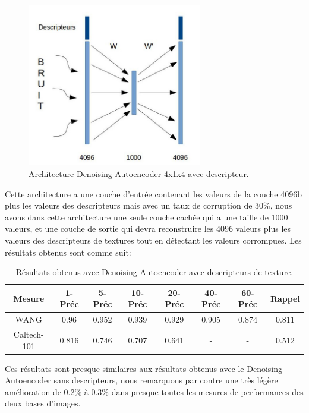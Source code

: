 \begin{figure}[H]
\centering
\includegraphics[width=3in]{Figures/ae/AE-Descripteur.jpg}
\caption[An Electron]{Architecture Denoising Autoencoder 4x1x4 avec descripteur.}
\label{fig:Electron}
\end{figure}

	Cette architecture a une couche d'entrée contenant les valeurs de la couche 4096b plus les valeurs des descripteurs mais avec un taux de corruption de 30\%, nous avons dans cette architecture une seule couche cachée qui a une taille de 1000 valeurs, et une couche de sortie qui devra reconstruire les 4096 valeurs plus les valeurs des descripteurs de textures tout en détectant les valeurs corrompues. Les résultats obtenus sont comme suit:

\begin{table}[H]
\begin{center}
\begin{tabular}{|c|c|c|c|c|c|c|c|}
\hline
	Mesure & 1-Préc & 5-Préc & 10-Préc & 20-Préc & 40-Préc & 60-Préc & Rappel\\
\hline
	WANG & 0.96 & 0.952 & 0.939 & 0.929 & 0.905 & 0.874 & 0.811\\
\hline
	Caltech-101 & 0.816 & 0.746 & 0.707 & 0.641 & - & - & 0.512\\
\hline
\end{tabular}
\end{center}
\caption{Résultats obtenus avec Denoising Autoencoder avec descripteurs de texture.}
\end{table}

	Ces résultats sont presque similaires aux résultats obtenus avec le Denoising Autoencoder sans descripteurs, nous remarquons par contre une très légère amélioration de 0.2\% à 0.3\% dans presque toutes les mesures de performances des deux bases d'images.
	

